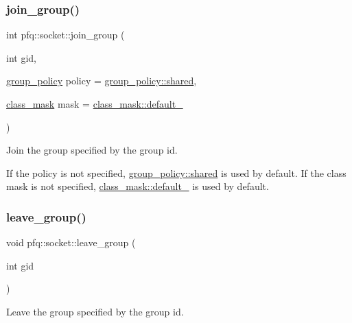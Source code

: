 \subsubsection{\texorpdfstring{join\+\_\+group()}{join\_group()}}
{\footnotesize\ttfamily int pfq\+::socket\+::join\+\_\+group (\begin{DoxyParamCaption}\item[{int}]{gid,  }\item[{\hyperlink{namespacepfq_ac41249c8510558905b01fa4d866a38d7}{group\+\_\+policy}}]{policy = {\ttfamily \hyperlink{namespacepfq_ac41249c8510558905b01fa4d866a38d7a9e81e7b963c71363e2fb3eefcfecfc0e}{group\+\_\+policy\+::shared}},  }\item[{\hyperlink{namespacepfq_a96af1f5ed530eff563eb917516758fbb}{class\+\_\+mask}}]{mask = {\ttfamily \hyperlink{namespacepfq_a96af1f5ed530eff563eb917516758fbba172b03053216c6158fe380805998ad6c}{class\+\_\+mask\+::default\+\_\+}} }\end{DoxyParamCaption})\hspace{0.3cm}{\ttfamily [inline]}}



Join the group specified by the group id. 

If the policy is not specified, \hyperlink{namespacepfq_ac41249c8510558905b01fa4d866a38d7a9e81e7b963c71363e2fb3eefcfecfc0e}{group\+\_\+policy\+::shared} is used by default. If the class mask is not specified, \hyperlink{namespacepfq_a96af1f5ed530eff563eb917516758fbba172b03053216c6158fe380805998ad6c}{class\+\_\+mask\+::default\+\_\+} is used by default. \mbox{\label{classpfq_1_1socket_ac512d6b89db52da73a51ba9112658180}} 
\subsubsection{\texorpdfstring{leave\+\_\+group()}{leave\_group()}}
{\footnotesize\ttfamily void pfq\+::socket\+::leave\+\_\+group (\begin{DoxyParamCaption}\item[{int}]{gid }\end{DoxyParamCaption})\hspace{0.3cm}{\ttfamily [inline]}}



Leave the group specified by the group id. 

